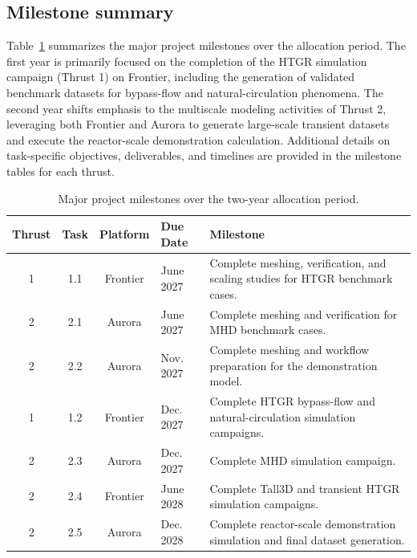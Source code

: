 \subsection*{Milestone summary}

Table~\ref{tab:milestones} summarizes the major project milestones over the allocation period. The first year is primarily focused on the completion of the HTGR simulation campaign (Thrust 1) on Frontier, including the generation of validated benchmark datasets for bypass-flow and natural-circulation phenomena. The second year shifts emphasis to the multiscale modeling activities of Thrust 2, leveraging both Frontier and Aurora to generate large-scale transient datasets and execute the reactor-scale demonstration calculation. Additional details on task-specific objectives, deliverables, and timelines are provided in the milestone tables for each thrust.

\begin{table}[htbp]
\centering
\caption{Major project milestones over the two-year allocation period.}
\label{tab:milestones}
\begin{tabular}{c c c l p{8cm}}
\hline
Thrust & Task & Platform & Due Date & Milestone \\
\hline

1 & 1.1 & Frontier & June 2027 &
Complete meshing, verification, and scaling studies for HTGR benchmark cases. \\

2 & 2.1 & Aurora & June 2027 &
Complete meshing and verification for MHD benchmark cases. \\

2 & 2.2 & Aurora & Nov. 2027 &
Complete meshing and workflow preparation for the demonstration model. \\

1 & 1.2 & Frontier & Dec. 2027 &
Complete HTGR bypass-flow and natural-circulation simulation campaigns. \\

2 & 2.3 & Aurora & Dec. 2027 &
Complete MHD simulation campaign. \\

\hline

2 & 2.4 & Frontier & June 2028 &
Complete Tall3D and transient HTGR simulation campaigns. \\

2 & 2.5 & Aurora & Dec. 2028 &
Complete reactor-scale demonstration simulation and final dataset generation. \\

\hline
\end{tabular}
\end{table}


